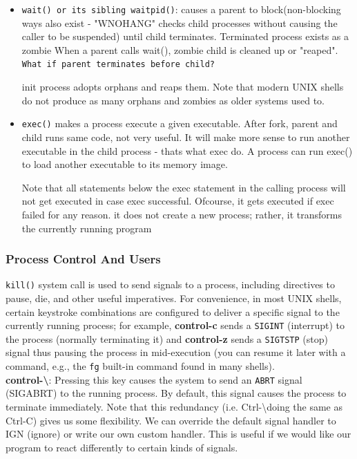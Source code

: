 \documentclass{article}
\begin{document}
\begin{itemize}
    \item \texttt{wait() or its sibling waitpid()}: causes a parent to block(non-blocking ways also exist - "WNOHANG" checks child processes without causing the caller to be suspended) until child terminates. Terminated process exists as a zombie When a parent calls wait(), zombie child is cleaned up or "reaped".
    \texttt{What if parent terminates before child?}
    
    init process adopts orphans and reaps them. Note that modern UNIX shells do not produce as many orphans and zombies as older systems used to.

    \item \texttt{exec()} makes a process execute a given executable. After fork, parent and child
    runs same code, not very useful. It will make more sense to run another executable in the child process - thats what exec do. A process can run exec() to load another executable to its
    memory image. 

    Note that all statements below the exec statement in the calling process will not get executed in case exec successful. Ofcourse, it gets executed if exec failed for any reason. it does not
    create a new process; rather, it transforms the currently running program
\end{itemize}

\subsubsection{Process Control And Users}
\texttt{kill()} system call is used to send signals to a process, including directives to pause, die, and other useful imperatives. For convenience, in most UNIX shells, certain keystroke combinations are configured to deliver a specific signal to the currently running process; for example, \textbf{control-c} sends a \texttt{SIGINT} (interrupt) to the process (normally terminating it) and \textbf{control-z} sends a \texttt{SIGTSTP} (stop) signal thus pausing the process in mid-execution (you can resume it later with a command, e.g., the \texttt{fg} built-in command found in many shells).\\

\textbf{control-\textbackslash}: Pressing this key causes the system to send an \texttt{ABRT} signal (SIGABRT) to the running process. By default, this signal causes the process to terminate immediately. Note that this redundancy (i.e. Ctrl-\textbackslash doing the same as Ctrl-C) gives us some flexibility.
We can override the default signal handler to IGN (ignore) or write our own custom handler. This is useful if we would like our program to react differently to certain kinds of signals.\\
\end{document}
